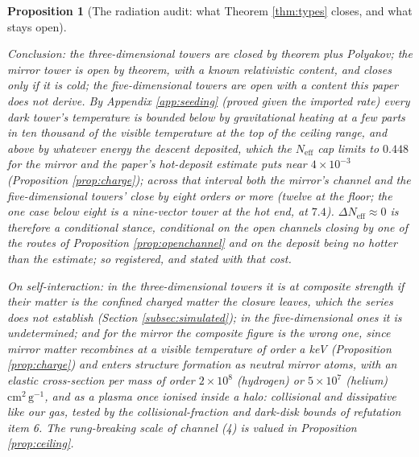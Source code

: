 \documentclass[11pt]{article}
\newtheorem{proposition}[theorem]{Proposition}
\theoremstyle{definition}
\newcommand{\Neff}{N_{\mathrm{eff}}}
\begin{document}
\begin{proposition}[The radiation audit: what Theorem \ref{thm:types} closes, and what stays open]
\begin{enumerate}
\end{enumerate}
Conclusion: the three-dimensional towers are closed by theorem plus Polyakov; the mirror tower is open by theorem, with a known relativistic content, and closes only if it is cold; the five-dimensional towers are open with a content this paper does not derive. By Appendix \ref{app:seeding} (proved given the imported rate) every dark tower's temperature is bounded below by gravitational heating at a few parts in ten thousand of the visible temperature at the top of the ceiling range, and above by whatever energy the descent deposited, which the $\Neff$ cap limits to $0.448$ for the mirror and the paper's hot-deposit estimate puts near $4 \times 10^{-3}$ (Proposition \ref{prop:charge}); across that interval both the mirror's channel and the five-dimensional towers' close by eight orders or more (twelve at the floor; the one case below eight is a nine-vector tower at the hot end, at $7.4$). $\Delta\Neff \approx 0$ is therefore a conditional stance, conditional on the open channels closing by one of the routes of Proposition \ref{prop:openchannel} and on the deposit being no hotter than the estimate; so registered, and stated with that cost.

On self-interaction: in the three-dimensional towers it is at composite strength if their matter is the confined charged matter the closure leaves, which the series does not establish (Section \ref{subsec:simulated}); in the five-dimensional ones it is undetermined; and for the mirror the composite figure is the wrong one, since mirror matter recombines at a visible temperature of order a keV (Proposition \ref{prop:charge}) and enters structure formation as neutral mirror atoms, with an elastic cross-section per mass of order $2 \times 10^{8}$ (hydrogen) or $5 \times 10^{7}$ (helium) $\mathrm{cm^{2}\,g^{-1}}$, and as a plasma once ionised inside a halo: collisional and dissipative like our gas, tested by the collisional-fraction and dark-disk bounds of refutation item 6. The rung-breaking scale of channel (4) is valued in Proposition \ref{prop:ceiling}.
\end{proposition}
\end{document}
